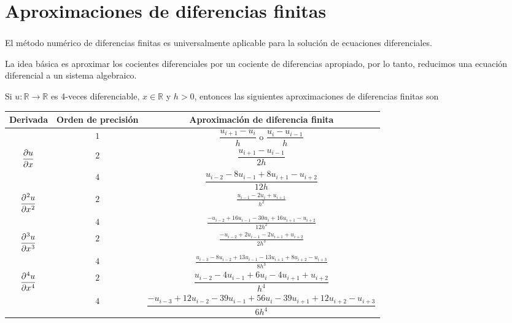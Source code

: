 \section{Aproximaciones de diferencias finitas}

\begin{frame}
	\frametitle{\insertsection}

	El método numérico de diferencias finitas es universalmente
	aplicable para la solución de ecuaciones diferenciales.

	La idea básica es aproximar los cocientes diferenciales por un
	cociente de diferencias apropiado, por lo tanto, reducimos una
	ecuación diferencial a un sistema algebraico.

	Si $u\colon\mathbb{R}\to\mathbb{R}$ es 4-veces diferenciable,
	$x\in\mathbb{R}$ y $h>0$, entonces las siguientes aproximaciones
	de diferencias finitas son
	\begin{table}[ht!]
		\centering
		\begin{tabular}{ccc}
			\hline
			Derivada                       & Orden de precisión & Aproximación de diferencia finita                                                \\
			\hline
			                               & $1$                & $\dfrac{u_{i+1}-u_{i}}{h}$ o $\dfrac{u_{i}-u_{i-1}}{h}$                          \\[.2cm]
			$\displaystyle\diffp{u}{x}$    & $2$                & $\dfrac{u_{i+1}-u_{i-1}}{2h}$                                                    \\[.2cm]
			                               & $4$                & $\dfrac{u_{i-2}-8u_{i-1}+8u_{i+1}-u_{i+2}}{12h}$                                 \\[.2cm]
			\hline
			$\displaystyle\diffp[2]{u}{x}$ & $2$                & $\frac{u_{i-1}-2u_{i}+u_{i+1}}{h^2}$                                             \\[.2cm]
			                               & $4$                & $\frac{-u_{i-2} + 16u_{i-1} - 30u_{i} + 16u_{i+1} - u_{i+2}}{12h^2}$             \\[.2cm]
			\hline
			$\displaystyle\diffp[3]{u}{x}$ & $2$                & $\frac{-u_{i-2} + 2u_{i-1} - 2u_{i+1} + u_{i+2}}{2h^3}$                          \\[.2cm]
			                               & $4$                & $ \frac{u_{i-3} - 8u_{i-2} + 13u_{i-1} - 13u_{i+1} + 8u_{i+2} - u_{i+3}}{8h^3}$  \\[.2cm]
			\hline
			$\displaystyle\diffp[4]{u}{x}$ & $2$                & $\dfrac{u_{i-2}-4u_{i-1}+6u_{i}-4u_{i+1}+u_{i+2}}{h^4}$                          \\[.2cm]
			                               & $4$                & $\dfrac{-u_{i-3}+12u_{i-2}-39u_{i-1}+56u_{i}-39u_{i+1}+12u_{i+2}-u_{i+3}}{6h^4}$ \\[.2cm]
			\hline
		\end{tabular}
	\end{table}
\end{frame}

